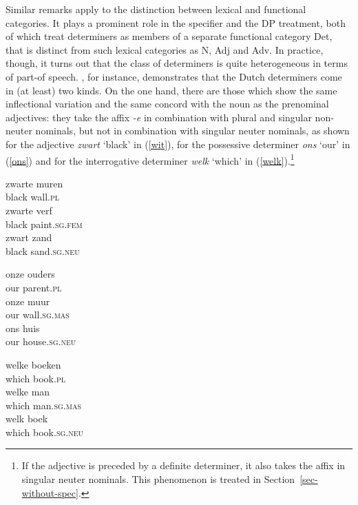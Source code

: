 \documentclass[output=paper
                ,modfonts
                ,nonflat
	        ,collection
	        ,collectionchapter
	        ,collectiontoclongg
 	        ,biblatex
                ,babelshorthands
                ,newtxmath
                ,draftmode
                ,colorlinks, citecolor=brown
]{./langsci/langscibook}
\begin{document}
Similar remarks apply to the distinction between lexical and functional categories. 
It plays a prominent role in the specifier and the DP treatment, both of which treat 
determiners as members of a separate functional category Det, that is distinct from 
such lexical categories as N, Adj and Adv.
In practice, though, it turns out that the class of determiners is quite heterogeneous in 
terms of part-of speech. \citet{VanEynde06}, for instance, demonstrates that the 
Dutch determiners come in (at least) two kinds. On the one hand, there are those 
which show the same inflectional variation and the same concord with the noun as the 
prenominal adjectives: they take the affix \emph{-e} in combination with plural 
and singular non-neuter nominals, but not in combination with singular 
neuter nominals, as shown for the adjective \emph{zwart} `black' in (\ref{wit}), 
for the possessive determiner \emph{ons} `our' in (\ref{ons}) and for the 
interrogative determiner \emph{welk} `which' in (\ref{welk}).\footnote{If the adjective 
is preceded by a definite determiner, 
it also takes the affix in singular neuter nominals. This phenomenon is treated 
in Section~\ref{sec-without-spec}.} 

\begin{exe} 
\ex\label{wit} 
\begin{xlist}
\ex
\gll  zwarte muren      \\
      black wall.\textsc{pl} \\
\ex
\gll  zwarte verf \\
      black paint.\textsc{sg.fem} \\
\ex
\gll  zwart zand \\
      black sand.\textsc{sg.neu} \\
\end{xlist}
\ex\label{ons}
\begin{xlist}
\ex
\gll onze ouders     \\
     our parent.\textsc{pl}  \\
\ex
\gll onze muur     \\
     our wall.\textsc{sg.mas}  \\
\ex
\gll ons huis     \\
     our house.\textsc{sg.neu}  \\
\end{xlist}
\ex\label{welk}
\begin{xlist} 
\ex
\gll welke boeken  \\
     which book.\textsc{pl} \\
\ex
\gll welke man                 \\
     which man.\textsc{sg.mas}  \\
\ex
\gll welk boek   \\
     which book.\textsc{sg.neu} \\
\end{xlist}
\end{exe} 
\end{document}
